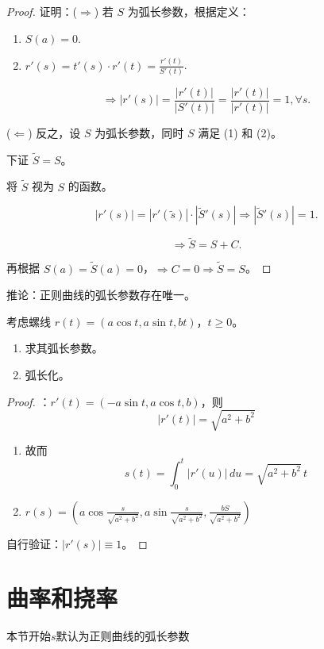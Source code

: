 \documentclass[lang=cn,10pt,thmcnt=section]{elegantbook}
\begin{document}
    \begin{proof}
    证明：($\Rightarrow$) 若 $S$ 为弧长参数，根据定义：
    \begin{enumerate}
        \item $S(a) = 0$.
        \item $r'(s) = t'(s) \cdot r'(t) = \frac{r'(t)}{S'(t)}$.
    \end{enumerate}
    \[
    \Rightarrow |r'(s)| = \frac{|r'(t)|}{|S'(t)|} = \frac{|r'(t)|}{|r'(t)|} = 1, \forall s.
    \]
    
    ($\Leftarrow$) 反之，设 $S$ 为弧长参数，同时 $S$ 满足 (1) 和 (2)。
    
    下证 $\tilde{S} = S$。
    
    将 $\tilde{S}$ 视为 $S$ 的函数。
    
    \[
    |r'(s)| = |r'(\tilde{s})| \cdot |\tilde{S}'(s)| \Rightarrow |\tilde{S}'(s)| = 1.
    \]
    
    \[
    \Rightarrow \tilde{S} = S + C.
    \]
    
    再根据 $S(a) = \tilde{S}(a) = 0$，$\Rightarrow C = 0 \Rightarrow \tilde{S} = S$。
    
    \end{proof}
    
    推论：正则曲线的弧长参数存在唯一。  
\begin{example}[弧长参数的计算]
        考虑螺线 $r(t) = (a \cos t, a \sin t, b t)$，$t \geq 0$。
        \begin{enumerate}
            \item 求其弧长参数。
            \item 弧长化。
        \end{enumerate}
        \begin{proof}
            ：$r'(t) = (-a \sin t, a \cos t, b)$，则
        \[
        |r'(t)| = \sqrt{a^2 + b^2}
        \]
        \begin{enumerate}
            \item 故而
            \[
            s(t) = \int_0^t |r'(u)| \, du = \sqrt{a^2 + b^2} \, t
            \]
            \item $r(s) = \left( a \cos \frac{s}{\sqrt{a^2 + b^2}}, a \sin \frac{s}{\sqrt{a^2 + b^2}}, \frac{b S}{\sqrt{a^2 + b^2}} \right)$
        \end{enumerate}
        自行验证：$|r'(s)| \equiv 1$。
        \end{proof}
\end{example} 
\section{曲率和挠率}
本节开始$s$默认为正则曲线的弧长参数
\end{document}
